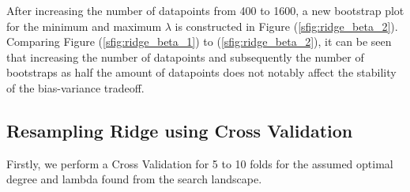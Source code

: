 \documentclass[11pt, a4paper]{article}
\begin{document}
After increasing the number of datapoints from 400 to 1600, a new bootstrap plot for the minimum and maximum $\lambda$ is constructed in Figure (\ref{sfig:ridge_beta_2}). Comparing Figure (\ref{sfig:ridge_beta_1}) to (\ref{sfig:ridge_beta_2}), it can be seen that increasing the number of datapoints and subsequently the number of bootstraps as half the amount of datapoints does not notably affect the stability of the bias-variance tradeoff.

\subsection*{Resampling Ridge using Cross Validation}
Firstly, we perform a Cross Validation for 5 to 10 folds for the assumed optimal degree and lambda found from the search landscape. 
\end{document}
